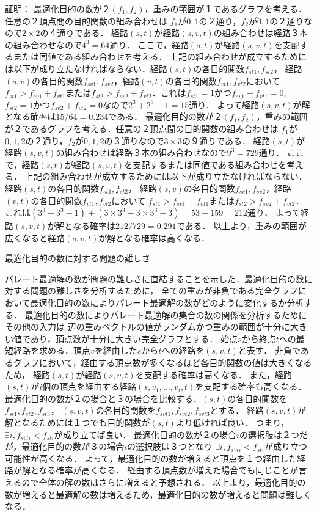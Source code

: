 \documentclass[12pt]{optlab-bachelor}
\begin{document}
証明：
最適化目的の数が２$(f_1,f_2)$，重みの範囲が１であるグラフを考える．任意の２頂点間の目的関数の組み合わせは
$f_1$が$0,1$の２通り，$f_2$が$0,1$の２通りなので$2 \times 2$の４通りである．
経路$(s,t)$が経路$(s,v,t)$の組み合わせは経路３本の組み合わせなので$4^3 = 64$通り．
ここで，経路$(s,t)$が経路$(s,v,t)$を支配するまたは同値である組み合わせを考える．
上記の組み合わせが成立するためには以下が成り立たなければならない．経路$(s,t)$の各目的関数$f_{st1},f_{st2}$，
経路$(s,v)$の各目的関数$f_{sv1},f_{sv2}$，経路$(v,t)$の各目的関数$f_{vt1},f_{vt2}$において
$f_{st1}>f_{sv1}+f_{vt1}$または$f_{st2}>f_{sv2}+f_{vt2}$．これは$f_{st1}=1$かつ$f_{sv1}+f_{vt1}=0$,
$f_{st2}=1$かつ$f_{sv2}+f_{vt2}=0$なので$2^3+2^3-1=15$通り．
よって経路$(s,v,t)$が解となる確率は$15/64=0.234$である．
最適化目的の数が２$(f_1,f_2)$，重みの範囲が２であるグラフを考える．任意の２頂点間の目的関数の組み合わせは
$f_1$が$0,1,2$の２通り，$f_2$が$0,1,2$の３通りなので$3 \times 3$の９通りである．
経路$(s,t)$が経路$(s,v,t)$の組み合わせは経路３本の組み合わせなので$9^3 = 729$通り．
ここで，経路$(s,t)$が経路$(s,v,t)$を支配するまたは同値である組み合わせを考える．
上記の組み合わせが成立するためには以下が成り立たなければならない．経路$(s,t)$の各目的関数$f_{st1},f_{st2}$，
経路$(s,v)$の各目的関数$f_{sv1},f_{sv2}$，経路$(v,t)$の各目的関数$f_{vt1},f_{vt2}$において
$f_{st1}>f_{sv1}+f_{vt1}$または$f_{st2}>f_{sv2}+f_{vt2}$．
これは$(3^3+3^3-1)+(3 \times 3^3 + 3 \times 3^3 - 3)=53+159=212$通り．
よって経路$(s,v,t)$が解となる確率は$212/729=0.291$である．
以上より，重みの範囲が広くなると経路$(s,v,t)$が解となる確率は高くなる．

\begin{description}
  \item[最適化目的の数に対する問題の難しさ]
\end{description}

パレート最適解の数が問題の難しさに直結することを示した．最適化目的の数に対する問題の難しさを分析するために，
全ての重みが非負である完全グラフにおいて最適化目的の数によりパレート最適解の数がどのように変化するか分析する．
最適化目的の数によりパレート最適解の集合の数の関係を分析するためにその他の入力は
辺の重みベクトルの値がランダムかつ重みの範囲が十分に大きい値であり，頂点数が十分に大きい完全グラフとする．
始点$s$から終点$t$への最短経路を求める．頂点$v$を経由した$s$から$t$への経路を$(s,v,t)$と表す．
非負であるグラフにおいて，経由する頂点数が多くなるほど各目的関数の値は大きくなるため，
経路$(s,t)$が経路$(s,v,t)$を支配する確率は高くなる．
また，経路$(s,t)$が$i$個の頂点を経由する経路$(s,v_1,\ldots,v_i,t)$を支配する確率も高くなる．
最適化目的の数が２の場合と３の場合を比較する．$(s,t)$の各目的関数を$f_{st1},f_{st2},f_{st3}$，
$(s,v,t)$の各目的関数を$f_{svt1},f_{svt2},f_{svt3}$とする．
経路$(s,v,t)$が解となるためには１つでも目的関数が$(s,t)$より低ければ良い．
つまり，$\exists i ,f_{svti}<f_{sti}$が成り立てば良い．
最適化目的の数が２の場合$i$の選択肢は２つだが，最適化目的の数が３の場合$i$の選択肢は３つとなり
$\exists i ,f_{svti}<f_{sti}$が成り立つ可能性が高くなる．
よって，最適化目的の数が増えると頂点を１つ経由した経路が解となる確率が高くなる．
経由する頂点数が増えた場合でも同じことが言えるので全体の解の数はさらに増えると予想される．
以上より，最適化目的の数が増えると最適解の数は増えるため，最適化目的の数が増えると問題は難しくなる．
\end{document}
